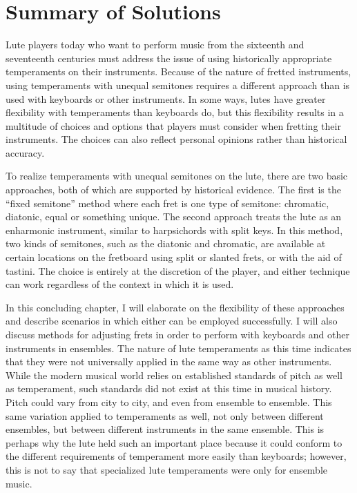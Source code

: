 \chapter{Summary of Solutions}

Lute players today who want to perform music from the sixteenth and seventeenth
centuries must address the issue of using historically appropriate temperaments on
their instruments. Because of the nature of fretted instruments, using temperaments
with unequal semitones requires a different approach than is used with keyboards or
other instruments. In some ways, lutes have greater flexibility with temperaments than
keyboards do, but this flexibility results in a multitude of choices and options that
players must consider when fretting their instruments. The choices can also reflect
personal opinions rather than historical accuracy.

To realize temperaments with unequal semitones on the lute, there are two basic approaches, both of
which are supported by historical evidence. The first is the ``fixed semitone'' method where each
fret is one type of semitone: chromatic, diatonic, equal or something unique. The second approach
treats the lute as an enharmonic instrument, similar to harpsichords with split keys. In this
method, two kinds of semitones, such as the diatonic and chromatic, are available at certain
locations on the fretboard using split or slanted frets, or with the aid of tastini. The choice is
entirely at the discretion of the player, and either technique can work regardless of the context in
which it is used.

In this concluding chapter, I will elaborate on the flexibility of these approaches and describe
scenarios in which either can be employed successfully.  I will also discuss methods for adjusting
frets in order to perform with keyboards and other instruments in ensembles. The nature of lute
temperaments as this time indicates that they were not universally applied in the same way as other
instruments. While the modern musical world relies on established standards of pitch as well as
temperament, such standards did not exist at this time in musical history. Pitch could vary from
city to city, and even from ensemble to ensemble. This same variation applied to temperaments as
well, not only between different ensembles, but between different instruments in the same ensemble.
This is perhaps why the lute held such an important place because it could conform to the different
requirements of temperament more easily than keyboards; however, this is not to say that specialized
lute temperaments were only for ensemble music.

